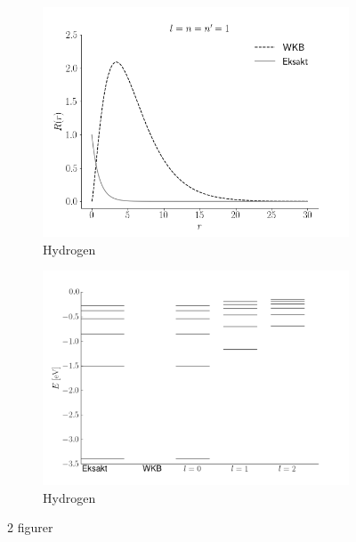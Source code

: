 \begin{figure}[h!]
    \centering
    \begin{subfigure}{0.45\textwidth}
        \centering
        \includegraphics[width=\columnwidth]{sammenligning.png}
        \caption{Hydrogen}
        \label{fig:hydrogen}
    \end{subfigure}
    \begin{subfigure}{0.45\textwidth}
        \centering
        \includegraphics[width=\columnwidth]{energyPlot}
        \caption{Hydrogen}
        \label{fig:sammenlign}
    \end{subfigure}
    \caption{2 figurer}
    \label{storfig}
\end{figure}


%
